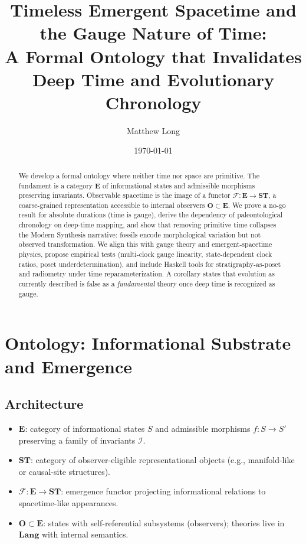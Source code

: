 \documentclass[11pt]{article}
\title{\textbf{Timeless Emergent Spacetime and the Gauge Nature of Time: \\
A Formal Ontology that Invalidates Deep Time and Evolutionary Chronology}}
\author[1]{Matthew Long}
\affil[1]{Yoneda AI}
\date{\today}
\theoremstyle{definition}
\theoremstyle{plain}
\theoremstyle{remark}
\newcommand{\Ecat}{\mathbf{E}}      %
\newcommand{\ST}{\mathbf{ST}}       %
\newcommand{\Lang}{\mathbf{Lang}}   %
\newcommand{\Obs}{\mathbf{O}}       %
\newcommand{\F}{\mathcal{F}}        %
\newcommand{\I}{\mathcal{I}}        %
\begin{document}
\maketitle

\begin{abstract}
We develop a formal ontology where neither time nor space are primitive. The fundament is a category $\Ecat$ of informational states and admissible morphisms preserving invariants. Observable spacetime is the image of a functor $\F:\Ecat\to\ST$, a coarse-grained representation accessible to internal observers $\Obs\subset\Ecat$. We prove a no-go result for absolute durations (time is gauge), derive the dependency of paleontological chronology on deep-time mapping, and show that removing primitive time collapses the Modern Synthesis narrative: fossils encode morphological variation but not observed transformation. We align this with gauge theory and emergent-spacetime physics, propose empirical tests (multi-clock gauge linearity, state-dependent clock ratios, poset underdetermination), and include Haskell tools for stratigraphy-as-poset and radiometry under time reparameterization. A corollary states that evolution as currently described is false as a \emph{fundamental} theory once deep time is recognized as gauge.
\end{abstract}

\tableofcontents

\section{Ontology: Informational Substrate and Emergence}
\subsection{Architecture}
\begin{itemize}[leftmargin=1.2em]
\item $\Ecat$: category of informational states $S$ and admissible morphisms $f:S\to S'$ preserving a family of invariants $\I$.
\item $\ST$: category of observer-eligible representational objects (e.g., manifold-like or causal-site structures).
\item $\F:\Ecat\to\ST$: emergence functor projecting informational relations to spacetime-like appearances.
\item $\Obs\subset\Ecat$: states with self-referential subsystems (observers); theories live in $\Lang$ with internal semantics.
\end{itemize}
\end{document}
